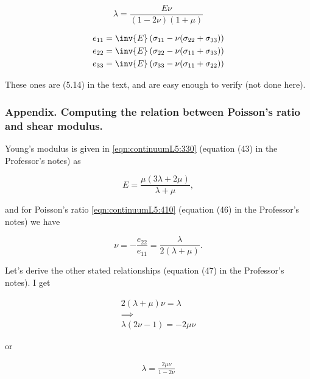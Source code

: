 \begin{equation}\label{eqn:continuumL5:450}
\lambda = \frac{E \nu}{(1 - 2 \nu)(1 + \mu)}
\end{equation}

\begin{align}\label{eqn:continuumL5:470}
e_{11} &= \inv{E}\left( \sigma_{11} - \nu(\sigma_{22} + \sigma_{33}) \right) \\
e_{22} &= \inv{E}\left( \sigma_{22} - \nu(\sigma_{11} + \sigma_{33}) \right) \\
e_{33} &= \inv{E}\left( \sigma_{33} - \nu(\sigma_{11} + \sigma_{22}) \right)
\end{align}

These ones are (5.14) in the text, and are easy enough to verify (not done here).

\subsubsection{Appendix.  Computing the relation between Poisson's ratio and shear modulus.}

Young's modulus is given in \ref{eqn:continuumL5:330} (equation (43) in the Professor's notes) as

\begin{equation}\label{eqn:continuumL6:490}
E = \frac{\mu(3 \lambda + 2 \mu)}{\lambda + \mu },
\end{equation}

and for Poisson's ratio \ref{eqn:continuumL5:410} (equation (46) in the Professor's notes) we have

\begin{equation}\label{eqn:continuumL6:510}
\nu = -\frac{e_{22}}{e_{11}} = \frac{\lambda}{2 (\lambda + \mu)}.
\end{equation}


Let's derive the other stated relationships (equation (47) in the Professor's notes).  I get

\begin{align*}
2 (\lambda + \mu) \nu = \lambda \\
\implies \\
\lambda ( 2 \nu - 1 ) = - 2\mu\nu
\end{align*}

or

\begin{align*}
\lambda = \frac{ 2 \mu \nu} { 1 - 2 \nu }
\end{align*}

